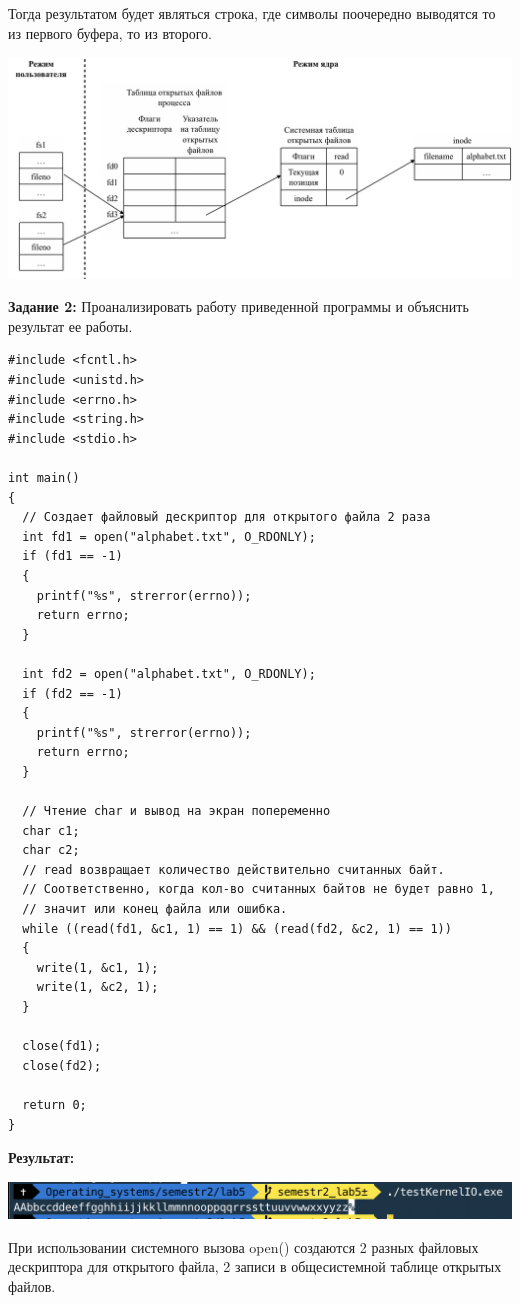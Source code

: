 \documentclass[a4paper,14pt]{extreport} %
\begin{document}
Тогда результатом будет являться строка, где символы поочередно выводятся то из первого буфера, то из второго. 

\includegraphics[scale=0.6]{shema1}

\newpage

\textbf{Задание 2:} Проанализировать работу приведенной программы и объяснить результат ее работы. 

\begin{lstlisting}[]
#include <fcntl.h>
#include <unistd.h>
#include <errno.h>
#include <string.h>
#include <stdio.h>

int main()
{
  // Создает файловый дескриптор для открытого файла 2 раза
  int fd1 = open("alphabet.txt", O_RDONLY);
  if (fd1 == -1)
  {
    printf("%s", strerror(errno));
    return errno;
  }

  int fd2 = open("alphabet.txt", O_RDONLY);
  if (fd2 == -1)
  {
    printf("%s", strerror(errno));
    return errno;
  }

  // Чтение char и вывод на экран попеременно
  char c1;
  char c2;
  // read возвращает количество действительно считанных байт.
  // Соответственно, когда кол-во считанных байтов не будет равно 1,
  // значит или конец файла или ошибка.
  while ((read(fd1, &c1, 1) == 1) && (read(fd2, &c2, 1) == 1))
  {
    write(1, &c1, 1);
    write(1, &c2, 1);
  }

  close(fd1);
  close(fd2);

  return 0;
}
\end{lstlisting}

\textbf{Результат:}

\includegraphics[scale=0.9]{2}

При использовании системного вызова open() создаются 2 разных файловых дескриптора для открытого файла, 2 записи в общесистемной таблице открытых файлов. 
\end{document}
